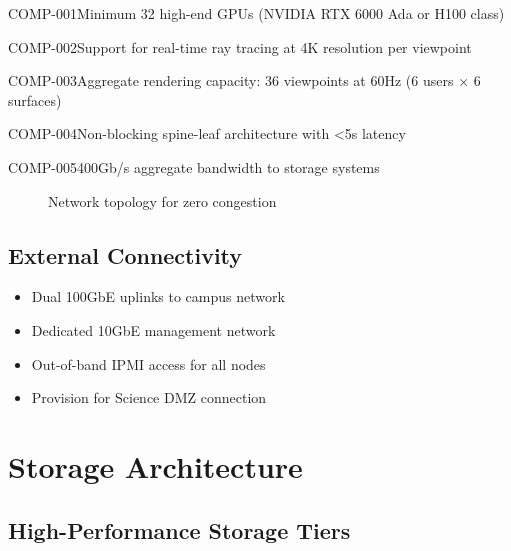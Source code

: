 \begin{requirement}{COMP-001}{Minimum 32 high-end GPUs (NVIDIA RTX 6000 Ada or H100 class)}
\begin{requirement}{COMP-002}{Support for real-time ray tracing at 4K resolution per viewpoint}
\begin{requirement}{COMP-003}{Aggregate rendering capacity: 36 viewpoints at 60Hz (6 users × 6 surfaces)}
\begin{requirement}{COMP-004}{Non-blocking spine-leaf architecture with <5\textmu s latency}
\begin{requirement}{COMP-005}{400Gb/s aggregate bandwidth to storage systems}
\begin{figure}[H]
\centering
{}
\caption{Network topology for zero congestion}
\end{figure}

\subsection{External Connectivity}

\begin{itemize}
    \item Dual 100GbE uplinks to campus network
    \item Dedicated 10GbE management network
    \item Out-of-band IPMI access for all nodes
    \item Provision for Science DMZ connection
\end{itemize}

\section{Storage Architecture}

\subsection{High-Performance Storage Tiers}


\end{requirement}
\end{requirement}
\end{requirement}
\end{requirement}
\end{requirement}

